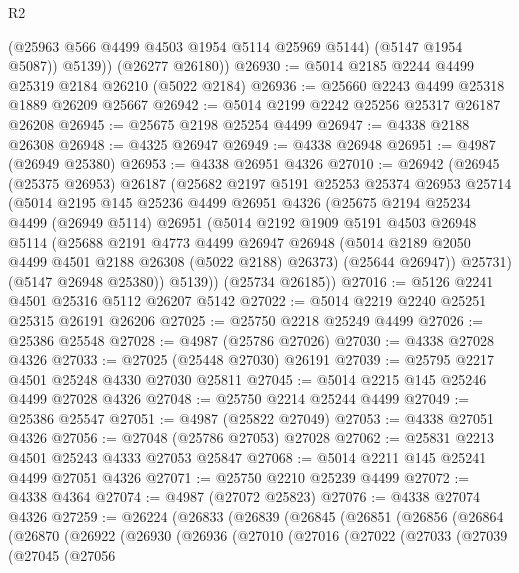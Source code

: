 \begin{lexlean}{R2}
\begin{coremodule}
            (@25963 @566 @4499 @4503 @1954 @5114 @25969 @5144)
            (@5147 @1954 @5087))
          @5139))
      (@26277 @26180))
@26930 := @5014 @2185 @2244 @4499 @25319 @2184 @26210 (@5022 @2184)
@26936 := @25660 @2243 @4499 @25318 @1889 @26209 @25667
@26942 := @5014 @2199 @2242 @25256 @25317 @26187 @26208
@26945 := @25675 @2198 @25254 @4499
@26947 := @4338 @2188 @26308
@26948 := @4325 @26947
@26949 := @4338 @26948
@26951 := @4987 (@26949 @25380)
@26953 := @4338 @26951 @4326
@27010 := @26942
    (@26945
      (@25375 @26953)
      @26187
      (@25682
        @2197
        @5191
        @25253
        @25374
        @26953
        @25714
        (@5014
          @2195
          @145
          @25236
          @4499
          @26951
          @4326
          (@25675
            @2194
            @25234
            @4499
            (@26949 @5114)
            @26951
            (@5014
              @2192
              @1909
              @5191
              @4503
              @26948
              @5114
              (@25688
                @2191
                @4773
                @4499
                @26947
                @26948
                (@5014 @2189 @2050 @4499 @4501 @2188 @26308 (@5022 @2188) @26373)
                (@25644 @26947))
              @25731)
            (@5147 @26948 @25380))
          @5139))
      (@25734 @26185))
@27016 := @5126 @2241 @4501 @25316 @5112 @26207 @5142
@27022 := @5014 @2219 @2240 @25251 @25315 @26191 @26206
@27025 := @25750 @2218 @25249 @4499
@27026 := @25386 @25548
@27028 := @4987 (@25786 @27026)
@27030 := @4338 @27028 @4326
@27033 := @27025 (@25448 @27030) @26191
@27039 := @25795 @2217 @4501 @25248 @4330 @27030 @25811
@27045 := @5014 @2215 @145 @25246 @4499 @27028 @4326
@27048 := @25750 @2214 @25244 @4499
@27049 := @25386 @25547
@27051 := @4987 (@25822 @27049)
@27053 := @4338 @27051 @4326
@27056 := @27048 (@25786 @27053) @27028
@27062 := @25831 @2213 @4501 @25243 @4333 @27053 @25847
@27068 := @5014 @2211 @145 @25241 @4499 @27051 @4326
@27071 := @25750 @2210 @25239 @4499
@27072 := @4338 @4364
@27074 := @4987 (@27072 @25823)
@27076 := @4338 @27074 @4326
@27259 := @26224
    (@26833
      (@26839
        (@26845
          (@26851
            (@26856
              (@26864
                (@26870
                  (@26922
                    (@26930
                      (@26936
                        (@27010
                          (@27016
                            (@27022
                              (@27033
                                (@27039
                                  (@27045
                                    (@27056

\end{coremodule}
\end{lexlean}
